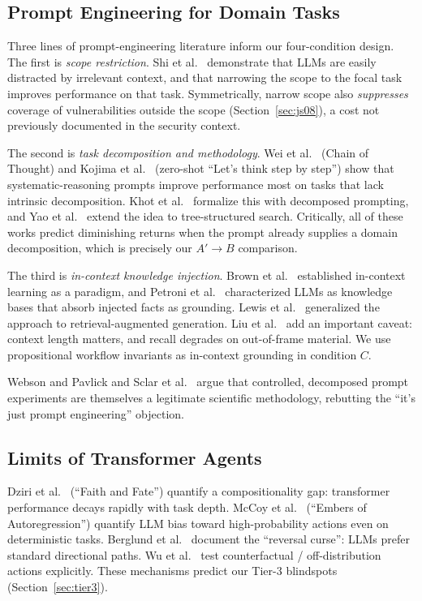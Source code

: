 \documentclass[conference]{IEEEtran}
\begin{document}
\subsection{Prompt Engineering for Domain Tasks}

Three lines of prompt-engineering literature inform our four-condition design. The first is \emph{scope restriction}. Shi et al.\ \cite{shi2023distracted} demonstrate that LLMs are easily distracted by irrelevant context, and that narrowing the scope to the focal task improves performance on that task. Symmetrically, narrow scope also \emph{suppresses} coverage of vulnerabilities outside the scope (Section~\ref{sec:js08}), a cost not previously documented in the security context.

The second is \emph{task decomposition and methodology}. Wei et al.\ \cite{wei2022cot} (Chain of Thought) and Kojima et al.\ \cite{kojima2022zeroshot} (zero-shot ``Let's think step by step'') show that systematic-reasoning prompts improve performance most on tasks that lack intrinsic decomposition. Khot et al.\ \cite{khot2023decomposed} formalize this with decomposed prompting, and Yao et al.\ \cite{yao2023tot} extend the idea to tree-structured search. Critically, all of these works predict diminishing returns when the prompt already supplies a domain decomposition, which is precisely our $A' \to B$ comparison.

The third is \emph{in-context knowledge injection}. Brown et al.\ \cite{brown2020gpt3} established in-context learning as a paradigm, and Petroni et al.\ \cite{petroni2019} characterized LLMs as knowledge bases that absorb injected facts as grounding. Lewis et al.\ \cite{lewis2020rag} generalized the approach to retrieval-augmented generation. Liu et al.\ \cite{liu2024lostmiddle} add an important caveat: context length matters, and recall degrades on out-of-frame material. We use propositional workflow invariants as in-context grounding in condition $C$.

Webson and Pavlick \cite{webson2022understand} and Sclar et al.\ \cite{sclar2024sensitivity} argue that controlled, decomposed prompt experiments are themselves a legitimate scientific methodology, rebutting the ``it's just prompt engineering'' objection.

\subsection{Limits of Transformer Agents}

Dziri et al.\ \cite{dziri2023faith} (``Faith and Fate'') quantify a compositionality gap: transformer performance decays rapidly with task depth. McCoy et al.\ \cite{mccoy2024embers} (``Embers of Autoregression'') quantify LLM bias toward high-probability actions even on deterministic tasks. Berglund et al.\ \cite{berglund2024reversal} document the ``reversal curse'': LLMs prefer standard directional paths. Wu et al.\ \cite{wu2024reasoning} test counterfactual / off-distribution actions explicitly. These mechanisms predict our Tier-3 blindspots (Section~\ref{sec:tier3}).
\end{document}
